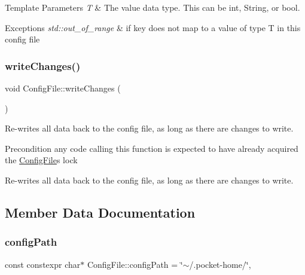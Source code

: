 \begin{DoxyTemplParams}{Template Parameters}
{\em T} & The value data type. This can be int, String, or bool.\\
\hline
\end{DoxyTemplParams}

\begin{DoxyExceptions}{Exceptions}
{\em std\+::out\+\_\+of\+\_\+range} & if key does not map to a value of type T in this config file \\
\hline
\end{DoxyExceptions}
\mbox{\label{classConfigFile_a4d2215793e3e3ff8132285f2caa82168}} 
\subsubsection{\texorpdfstring{write\+Changes()}{writeChanges()}}
{\footnotesize\ttfamily void Config\+File\+::write\+Changes (\begin{DoxyParamCaption}{ }\end{DoxyParamCaption})\hspace{0.3cm}{\ttfamily [protected]}}

Re-\/writes all data back to the config file, as long as there are changes to write.

\begin{DoxyPrecond}{Precondition}
any code calling this function is expected to have already acquired the \mbox{\hyperlink{classConfigFile}{Config\+File}}\textquotesingle{}s lock
\end{DoxyPrecond}
Re-\/writes all data back to the config file, as long as there are changes to write. 

\subsection{Member Data Documentation}
\mbox{\label{classConfigFile_ab0e244c7b281434d671c30e0f5278119}} 
\subsubsection{\texorpdfstring{config\+Path}{configPath}}
{\footnotesize\ttfamily const constexpr char$\ast$ Config\+File\+::config\+Path = \char`\"{}$\sim$/.pocket-\/home/\char`\"{}\hspace{0.3cm}{\ttfamily [static]}, {\ttfamily [protected]}}



